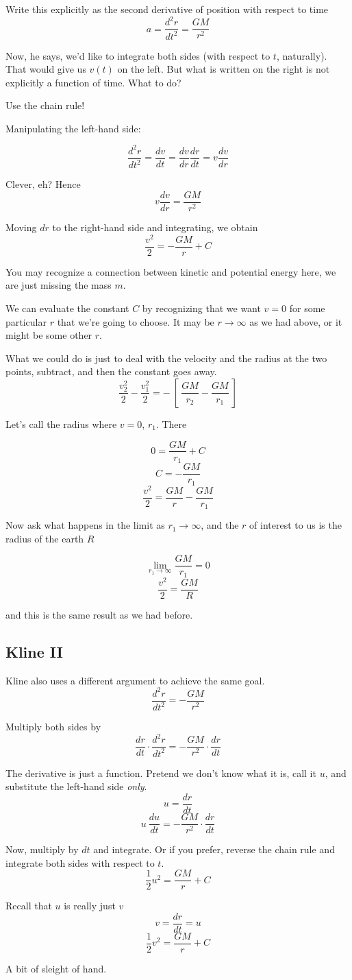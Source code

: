 \documentclass[11pt, oneside]{article}
\begin{document}
Write this explicitly as the second derivative of position with respect to time
\[ a = \frac{d^2 r}{dt^2} = \frac{GM}{r^2} \]

Now, he says, we'd like to integrate both sides (with respect to $t$, naturally).  That would give us $v(t)$ on the left.  But what is written on the right is not explicitly a function of time.  What to do?  

Use the chain rule!

Manipulating the left-hand side:

\[ \frac{d^2 r}{dt^2} = \frac{dv}{dt} = \frac{dv}{dr} \frac{dr}{dt} = v \frac{dv}{dr} \]

Clever, eh?  Hence
\[ v \frac{dv}{dr} = \frac{GM}{r^2} \]

Moving $dr$ to the right-hand side and integrating, we obtain
\[ \frac{v^2}{2} = -\frac{GM}{r} + C \]

You may recognize a connection between kinetic and potential energy here, we are just missing the mass $m$.

We can evaluate the constant $C$ by recognizing that we want $v=0$ for some particular $r$ that we're going to choose.  It may be $r \rightarrow \infty$ as we had above, or it might be some other $r$.  

What we could do is just to deal with the velocity and the radius at the two points, subtract, and then the constant goes away.
\[ \frac{v_2^2}{2} -  \frac{v_1^2}{2} = - \ [ \ \frac{GM}{r_2} - \frac{GM}{r_1} \ ]  \]

Let's call the radius where $v=0$, $r_{1}$.  There

\[ 0 = \frac{GM}{r_{1}} + C \]
\[ C = -\frac{GM}{r_{1}}  \]
\[ \frac{v^2}{2} = \frac{GM}{r} -\frac{GM}{r_{1}} \]

Now ask what happens in the limit as $r_1 \rightarrow \infty$, and the $r$ of interest to us is the radius of the earth $R$

\[ \lim_{r_1 \rightarrow \infty}  \frac{GM}{r_1} = 0 \]
\[ \frac{v^2}{2} = \frac{GM}{R}  \]

and this is the same result as we had before.

\subsection*{Kline II}

Kline also uses a different argument to achieve the same goal.
\[ \frac{d^2 r}{dt^2} = -\frac{GM}{r^2} \]

Multiply both sides by 
\[ \frac{dr}{dt} \cdot \frac{d^2 r}{dt^2} = -\frac{GM}{r^2} \cdot  \frac{dr}{dt} \]

The derivative is just a function.  Pretend we don't know what it is, call it $u$, and substitute the left-hand side \emph{only}.
\[ u = \frac{dr}{dt} \]
\[ u \ \frac{du}{dt} = -\frac{GM}{r^2} \cdot  \frac{dr}{dt} \]

Now, multiply by $dt$ and integrate.  Or if you prefer, reverse the chain rule and integrate both sides with respect to $t$.
\[ \frac{1}{2} u^2 =  \frac{GM}{r} + C \]

Recall that $u$ is really just $v$
\[  v = \frac{dr}{dt} = u \]
\[ \frac{1}{2} v^2 =  \frac{GM}{r} + C \]

A bit of sleight of hand.
\end{document}

